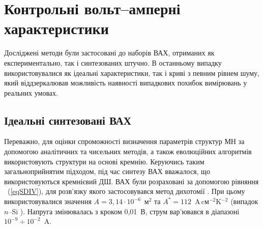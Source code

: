 
\section{Контрольні вольт--амперні характеристики}
Досліджені методи були застосовані до наборів ВАХ, отриманих як експериментально, так і синтезованих штучно.
В останньому випадку використовувалися як ідеальні характеристики, так і криві з певним рівнем шуму, який віддзеркалював можливість наявності випадкових похибок вимірювань у реальних умовах.

\subsection{Ідеальні синтезовані ВАХ\label{SubData}}
Переважно, для оцінки спроможності визначення параметрів структур МН за допомогою аналітичних \cite{Norde,Lien,Werner,Gromov,Lee,Bohlin,Cibils,Mikhelashvili,Kaminski} та чисельних \cite{Evangelou,Donoval} методів, а також еволюційних алгоритмів \cite{PSO_Ye,P-DE_Ishaque,TLBO_Patel} використовують структури на основі кремнію.
Керуючись таким загальноприйнятим підходом, під час синтезу ВАХ вважалося, що використовуються кремнієвий ДШ.
ВАХ були розраховані за допомогою рівняння ~(\ref{eqSDIV}), для розв'язку якого застосовувався метод дихотомії \cite[с.~158]{KalitkinBook}.
При цьому використовувалися значення $A=3,14\cdot10^{-6}$~м$^2$ та $A^*=112$~A$\,$cм$^{-2}$K$^{-2}$ (випадок $n$--Si \cite{Schroder2006}).
Напруга змінювалась з кроком 0,01~В, струм вар'ювався в діапазоні $10^{-9}\div10^{-2}$~A.

